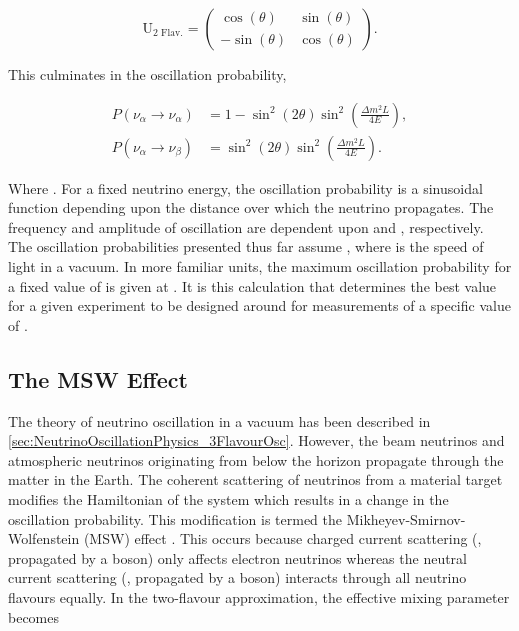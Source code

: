 \begin{equation}
  \label{eq:NeutrinoOscillationPhysics_PMNS_2Flavour}
  \mathrm{U_{\text{2 Flav.}}} = \begin{pmatrix} \cos(\theta) & \sin(\theta) \\ -\sin(\theta) & \cos(\theta) \end{pmatrix}.
\end{equation}

This culminates in the oscillation probability,

\begin{equation}
  \label{eq:NeutrinoOscillationPhysics_PMNS_2FlavourOscProb}
  \begin{split}
  P(\nu_{\alpha} \rightarrow \nu_{\alpha}) &= 1 - \sin^{2} \left( 2\theta \right) \sin^2 \left( \frac{\Delta m^{2} L}{4E} \right), \\
  P(\nu_{\alpha} \rightarrow \nu_{\beta}) &= \sin^{2} \left( 2\theta \right) \sin^2 \left( \frac{\Delta m^{2} L}{4E} \right).
  \end{split}
\end{equation}

Where \quickmath{\alpha \neq \beta}. For a fixed neutrino energy, the oscillation probability is a sinusoidal function depending upon the distance over which the neutrino propagates. The frequency and amplitude of oscillation are dependent upon  and , respectively. The oscillation probabilities presented thus far assume , where  is the speed of light in a vacuum. In more familiar units, the maximum oscillation probability for a fixed value of \quickmath{\theta} is given at . It is this calculation that determines the best  value for a given experiment to be designed around for measurements of a specific value of .

\subsection{The MSW Effect}
\label{sec:NeutrinoOscillationPhysics_MSW}

The theory of neutrino oscillation in a vacuum has been described in \autoref{sec:NeutrinoOscillationPhysics_3FlavourOsc}. However, the beam neutrinos and atmospheric neutrinos originating from below the horizon propagate through the matter in the Earth. The coherent scattering of neutrinos from a material target modifies the Hamiltonian of the system which results in a change in the oscillation probability. This modification is termed the Mikheyev-Smirnov-Wolfenstein (MSW) effect \cite{Smirnov2003-yb, msw, wolfenstein}. This occurs because charged current scattering (, propagated by a  boson) only affects electron neutrinos whereas the neutral current scattering (, propagated by a  boson) interacts through all neutrino flavours equally. In the two-flavour approximation, the effective mixing parameter becomes

